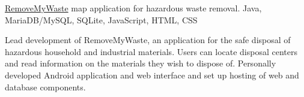 \showoff
{\textcolor{my-blue}{\href{https://removemywaste.liambeckman.com/}{RemoveMyWaste}}}
{map application for hazardous waste removal.}
{Java, MariaDB/MySQL, SQLite, JavaScript, HTML, CSS}
{}

Lead development of RemoveMyWaste, an application for the safe disposal of hazardous household and industrial materials. Users can locate disposal centers and read information on the materials they wish to dispose of. Personally developed Android application and web interface and set up hosting of web and database components.

